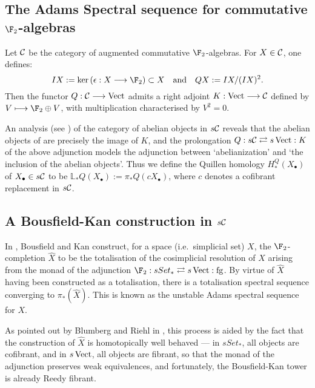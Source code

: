 \documentclass[10pt]{article}
\renewcommand{\Set}{Set}
\newcommand{\forgetSymbol}{\mathrm{fg}}
\newcommand{\Comm}{\calC}
\begin{document}
\begin{AdamsDerivation}
\section{The Adams Spectral sequence for commutative $\F_2$-algebras}
Let $\Comm$ be the category of augmented commutative $\F_2$-algebras. For $X\in \Comm$, one defines:
\[IX:=\ker(\epsilon:X\to\F_2)\subset X\textup{\quad and\quad }QX:=IX/(IX)^2.\]
Then the functor $Q:\Comm\to\Vect$ admits a right adjoint $K:\Vect\to\Comm$ defined by $V\mapsto \F_2\oplus V$, with multiplication characterised by $V^2=0$.

An analysis (see \cite[\S4]{MR1089001}) of the category of abelian objects in $s\Comm$ reveals that the abelian objects of are precisely the image of $K$, and the prolongation $Q:s\Comm\rightleftarrows s\Vect:K$ of the above adjunction models the adjunction between `abelianization' and `the inclusion of the abelian objects'. Thus we define the Quillen homology $H_*^Q(X_{\bullet})$ of $X_{\bullet}\in s\Comm$ to be $\mathbb{L}_*Q(X_{\bullet}):=\pi_*Q(cX_\bullet)$, where $c$ denotes a cofibrant replacement in $s\Comm$.





\subsection{A Bousfield-Kan construction in $s\Comm$}
In \cite{MR0365573}, Bousfield and Kan construct, for a space (i.e.\ simplicial set) $X$, the $\F_2$-completion $\hat X$ to be the totalisation of the cosimplicial resolution of $X$ arising from the monad of the adjunction $\F_2:s\Set_*\rightleftarrows s\Vect:\forgetSymbol$. By virtue of $\hat X$ having been constructed as a totalisation, there is a totalisation spectral sequence converging to $\pi_*(\hat X)$. This is known as the unstable Adams spectral sequence for $X$.

As pointed out by Blumberg and Riehl in \cite{BlumRiehlResolutions.pdf}, this process is aided by the fact that the construction of $\hat X$ is homotopically well behaved --- in $s\Set_*$, all objects are cofibrant, and in $s\operatorname{Vect}$, all objects are fibrant, so that the monad of the adjunction preserves weak equivalences, and fortunately, the Bousfield-Kan tower is already Reedy fibrant.


\end{AdamsDerivation}
\end{document}
